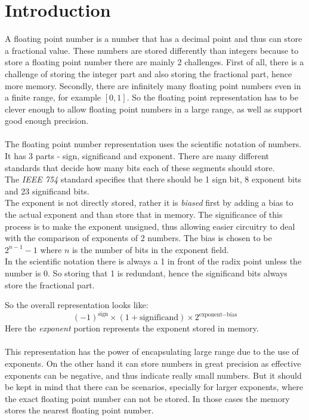 \documentclass[14pt]{article}
\begin{document}
\section{Introduction}
A floating point number is a number that has a decimal point and thus can store a fractional value. These numbers are stored differently than integers because to store a floating point number there are mainly 2 challenges. First of all, there is a challenge of storing the integer part and also storing the fractional part, hence more memory. Secondly, there are infinitely many floating point numbers even in a finite range, for example $[0, 1]$. So the floating point representation has to be clever enough to allow floating point numbers in a large range, as well as support good enough precision.\\\\

The floating point number representation uses the scientific notation of numbers. It has 3 parts - sign, significand and exponent. There are many different standards that decide how many bits each of these segments should store.\\
The \textit{IEEE 754} standard specifies that there should be 1 sign bit, 8 exponent bits and 23 significand bits.\\
The exponent is not directly stored, rather it is \textit{biased} first by adding a bias to the actual exponent and than store that in memory. The significance of this process is to make the exponent unsigned, thus allowing easier circuitry to deal with the comparison of exponents of 2 numbers. The bias is chosen to be $2^{n-1}-1$ where $n$ is the number of bits in the exponent field.\\
In the scientific notation there is always a 1 in front of the radix point unless the number is 0. So storing that 1 is redundant, hence the significand bits always store the fractional part.

So the overall representation looks like: 
$$(-1)^{\textrm{sign}}\times(1 + \textrm{significand})\times2^{\textrm{exponent}-\textrm{bias}}$$
Here the \textit{exponent} portion represents the exponent stored in memory.\\\\

This representation has the power of encapsulating large range due to the use of exponents. On the other hand it can store numbers in great precision as effective exponents can be negative, and thus indicate really small numbers. But it should be kept in mind that there can be scenarios, specially for larger exponents, where the exact floating point number can not be stored. In those cases the memory stores the nearest floating point number.
\end{document}
